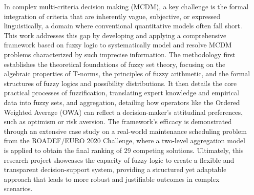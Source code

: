 \begin{poliabstract}
    In complex multi-criteria decision making (MCDM), a key challenge is the formal integration of criteria that are inherently vague, subjective, or expressed linguistically, a domain where conventional quantitative models often fall short. This work addresses this gap by developing and applying a comprehensive framework based on fuzzy logic to systematically model and resolve MCDM problems characterized by such imprecise information. The methodology first establishes the theoretical foundations of fuzzy set theory, focusing on the algebraic properties of T-norms, the principles of fuzzy arithmetic, and the formal structures of fuzzy logics and possibility distributions. It then details the core practical processes of fuzzification, translating expert knowledge and empirical data into fuzzy sets, and aggregation, detailing how operators like the Ordered Weighted Average (OWA) can reflect a decision-maker's attitudinal preferences, such as optimism or risk aversion. The framework's efficacy is demonstrated through an extensive case study on a real-world maintenance scheduling problem from the ROADEF/EURO 2020 Challenge, where a two-level aggregation model is applied to obtain the final ranking of 29 competing solutions. Ultimately, this research project showcases the capacity of fuzzy logic to create a flexible and transparent decision-support system, providing a structured yet adaptable approach that leads to more robust and justifiable outcomes in complex scenarios.
    \end{poliabstract}
\vspace{3em}
